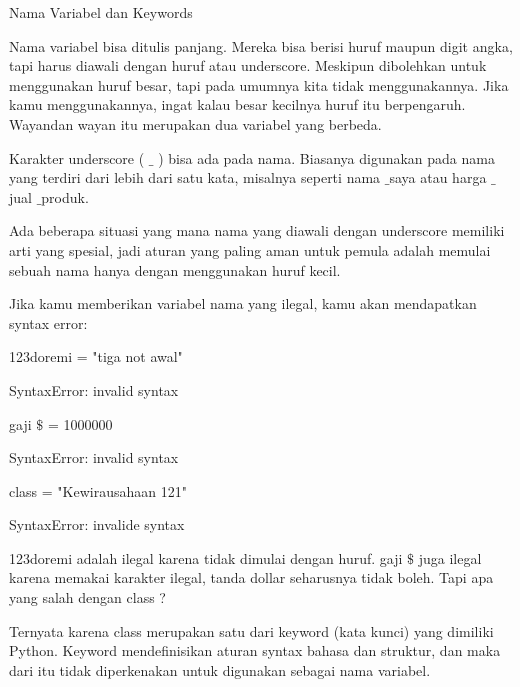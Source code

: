 \vspace{12pt}
\noindent 
 Nama Variabel dan Keywords \par
\vspace{12pt}
\noindent 
Nama variabel $  $bisa ditulis panjang. Mereka bisa berisi huruf maupun digit angka, tapi harus diawali dengan huruf atau underscore. Meskipun dibolehkan untuk menggunakan huruf besar, tapi pada umumnya kita tidak menggunakannya. Jika kamu menggunakannya, ingat kalau besar kecilnya huruf itu berpengaruh. $  $Wayandan $  $wayan $  $itu merupakan dua variabel yang berbeda. \par
\vspace{12pt}
\noindent 
Karakter underscore (  $  \_  $ ) bisa ada pada nama. Biasanya digunakan pada nama yang terdiri dari lebih dari satu kata, misalnya seperti $  $nama $  \_  $saya $  $atau $  $harga $  \_  $jual $  \_  $produk. \par
\vspace{12pt}
\noindent 
Ada beberapa situasi yang mana nama yang diawali dengan underscore memiliki arti yang spesial, jadi aturan yang paling aman untuk pemula adalah memulai sebuah nama hanya dengan menggunakan huruf kecil. \par
\vspace{12pt}
\noindent 
Jika kamu memberikan variabel nama yang ilegal, kamu akan mendapatkan syntax error: \par
\vspace{12pt}
\noindent 
123doremi = "tiga not awal" \par
\noindent 
SyntaxError: invalid syntax \par
\noindent 
gaji $  \$  $ = 1000000 \par
\noindent 
SyntaxError: invalid syntax \par
\noindent 
class = "Kewirausahaan 121" \par
\noindent 
SyntaxError: invalide syntax \par
\vspace{12pt}
\noindent 
123doremi $  $adalah ilegal karena tidak dimulai dengan huruf. $  $gaji $  \$  $ $  $juga ilegal karena memakai karakter ilegal, tanda dollar seharusnya tidak boleh. Tapi apa yang salah dengan $  $class $  $? \par
\vspace{12pt}
\noindent 
Ternyata karena $  $class $  $merupakan satu dari $  $keyword $  $(kata kunci) $  $yang dimiliki $  $Python. Keyword mendefinisikan aturan syntax bahasa dan struktur, dan maka dari itu tidak diperkenakan untuk digunakan sebagai nama variabel. \par
